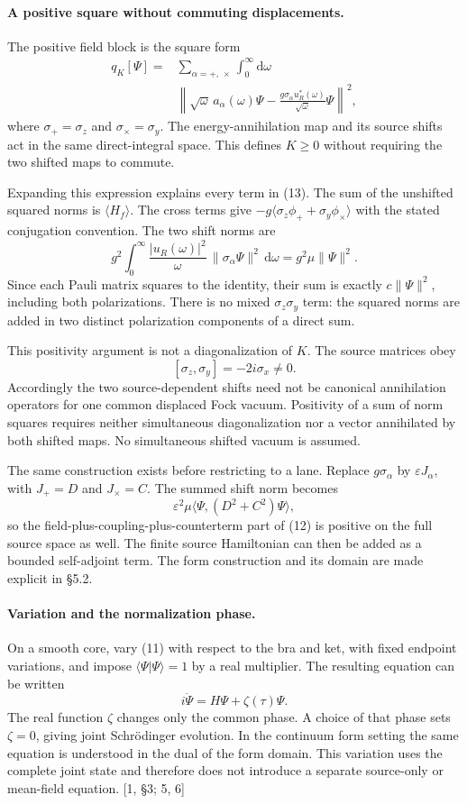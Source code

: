 \documentclass[10pt,twocolumn,letterpaper]{article}
\begin{document}
\paragraph{A positive square without commuting displacements.}
The positive field block is the square form
\[
\begin{aligned}
q_K[\Psi]={}&\sum_{\alpha=+,\,\times}\int_0^\infty\mathrm{d}\omega\\
&\left\|\sqrt{\omega}\,a_\alpha(\omega)\Psi
-\frac{g\sigma_\alpha u_R^*(\omega)}{\sqrt{\omega}}\Psi\right\|^2,
\end{aligned}
\]
where $\sigma_+=\sigma_z$ and $\sigma_\times=\sigma_y$. The
energy-annihilation map and its source shifts act in the same
direct-integral space. This defines $K\geq0$ without requiring the two
shifted maps to commute.

Expanding this expression explains every term in (13).  The sum of the
unshifted squared norms is $\langle H_f\rangle$.  The cross terms give
$-g\langle\sigma_z\phi_++\sigma_y\phi_\times\rangle$ with the stated
conjugation convention.  The two shift norms are
\[
g^2\int_0^\infty\frac{|u_R(\omega)|^2}{\omega}\,
\|\sigma_\alpha\Psi\|^2\,\mathrm d\omega
=g^2\mu\|\Psi\|^2.
\]
Since each Pauli matrix squares to the identity, their sum is exactly
$c\|\Psi\|^2$, including both polarizations.  There is no mixed
$\sigma_z\sigma_y$ term: the squared norms are added in two distinct
polarization components of a direct sum.

This positivity argument is not a diagonalization of $K$.  The source
matrices obey
\[
[\sigma_z,\sigma_y]=-2i\sigma_x\ne0.
\]
Accordingly the two source-dependent shifts need not be canonical
annihilation operators for one common displaced Fock vacuum.  Positivity
of a sum of norm squares requires neither simultaneous diagonalization
nor a vector annihilated by both shifted maps.  No simultaneous shifted
vacuum is assumed.

The same construction exists before restricting to a lane.  Replace
$g\sigma_\alpha$ by $\varepsilon J_\alpha$, with $J_+=D$ and
$J_\times=C$.  The summed shift norm becomes
\[
\varepsilon^2\mu
\langle\Psi,(D^2+C^2)\Psi\rangle,
\]
so the field-plus-coupling-plus-counterterm part of (12) is positive on
the full source space as well.  The finite source Hamiltonian can then be
added as a bounded self-adjoint term.  The form construction and its
domain are made explicit in \S5.2.

\paragraph{Variation and the normalization phase.}
On a smooth core, vary (11) with respect to the bra and ket, with fixed
endpoint variations, and impose $\langle\Psi|\Psi\rangle=1$ by a real
multiplier.  The resulting equation can be written
\[
i\dot\Psi=H\Psi+\zeta(\tau)\Psi.
\]
The real function $\zeta$ changes only the common phase.  A choice of that
phase sets $\zeta=0$, giving joint Schr\"odinger evolution.  In the
continuum form setting the same equation is understood in the dual of
the form domain.  This variation uses the complete joint state and
therefore does not introduce a separate source-only or mean-field
equation. [1, \S3; 5, 6]
\end{document}
